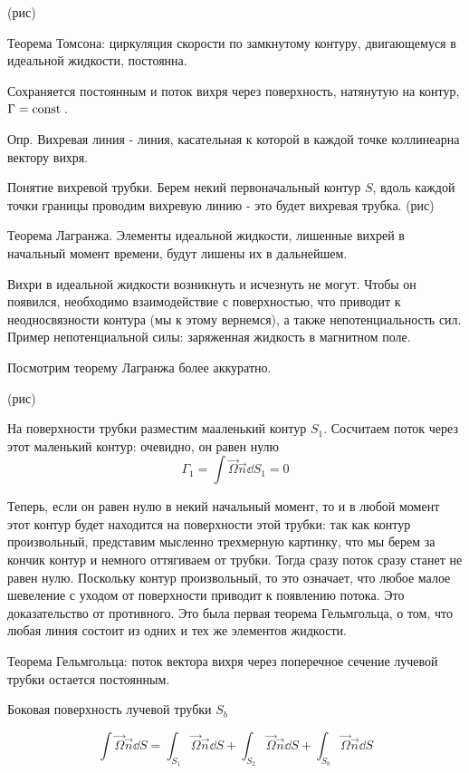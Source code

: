 (рис)

Теорема Томсона: циркуляция скорости по замкнутому контуру, двигающемуся в идеальной жидкости, постоянна.

Сохраняется постоянным и поток вихря через поверхность, натянутую на контур, $\Gamma=\mathrm{const}\,$.

Опр. Вихревая линия - линия, касательная к которой в каждой точке коллинеарна вектору вихря.

Понятие вихревой трубки. Берем некий первоначальный контур $S$, вдоль каждой точки границы проводим вихревую линию - это будет вихревая трубка. (рис)

Теорема Лагранжа. Элементы идеальной жидкости, лишенные вихрей в начальный момент времени, будут лишены их в дальнейшем.

Вихри в идеальной жидкости возникнуть и исчезнуть не могут. Чтобы он появился, необходимо взаимодействие с поверхностью, что приводит к неодносвязности контура (мы к этому вернемся), а также непотенциальность сил. Пример непотенциальной силы: заряженная жидкость в магнитном поле.

Посмотрим теорему Лагранжа более аккуратно. 

(рис)

На поверхности трубки разместим мааленький контур $S_1$. Сосчитаем поток через этот маленький контур: очевидно, он равен нулю 
\begin{equation}
	\Gamma_1=\int \vec\Omega \vec{n}\dd S_1 = 0
\end{equation}

Теперь, если он равен нулю в некий начальный момент, то и в любой момент этот контур будет находится на поверхности этой трубки: так как контур произвольный, представим мысленно трехмерную картинку, что мы берем за кончик контур и немного оттягиваем от трубки. Тогда сразу поток сразу станет не равен нулю. Поскольку контур произвольный, то это означает, что любое малое шевеление с уходом от поверхности приводит к появлению потока. Это доказательство от противного. Это была первая теорема Гельмгольца, о том, что любая линия состоит из одних и тех же элементов жидкости.

Теорема Гельмгольца: поток вектора вихря через поперечное сечение лучевой трубки остается постоянным. 

Боковая поверхность лучевой трубки $S_b$

\begin{equation}
 	\int \vec \Omega \vec{n} \dd S=\int_{S_1} \vec \Omega \vec{n} \dd S  + \int_{S_2} \vec \Omega \vec{n} \dd S + \int_{S_b} \vec \Omega \vec{n} \dd S
 \end{equation} 

